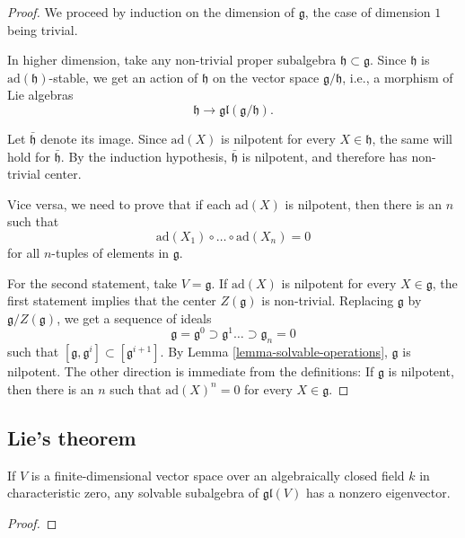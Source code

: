 \begin{proof}
 
We proceed by induction on the dimension of $\mathfrak g$, the case of dimension $1$ being trivial.
 
In higher dimension, take any non-trivial proper subalgebra $\mathfrak h \subset \mathfrak g$. Since $\mathfrak h$ is $\text{ad}(\mathfrak h)$-stable, we get an action of $\mathfrak h$ on the vector space $\mathfrak g/\mathfrak h$, i.e., a morphism of Lie algebras
 $$ \mathfrak h \to \mathfrak{gl}(\mathfrak g/\mathfrak h).$$
 
Let $\bar{\mathfrak h}$ denote its image. Since $\text{ad}(X)$ is nilpotent for every $X\in \mathfrak h$, the same will hold for $\bar{\mathfrak h}$. By the induction hypothesis, $\bar{\mathfrak h}$ is nilpotent, and therefore has non-trivial center.
 
Vice versa, we need to prove that if each $\text{ad}(X)$ is nilpotent, then there is an $n$ such that 
$$ \text{ad}(X_1) \circ \dots \circ \text{ad}(X_n) = 0$$
for all $n$-tuples of elements in $\mathfrak g$. 
 


For the second statement, take $V=\mathfrak g$. If $\text{ad}(X)$ is nilpotent for every $X \in \mathfrak g$, the first statement implies that the center $Z(\mathfrak g)$ is non-trivial. Replacing $\mathfrak g$ by $\mathfrak g/Z(\mathfrak g)$, we get a sequence of ideals 
$$ \mathfrak g = \mathfrak g^0 \supset \mathfrak g^1 \dots \supset \mathfrak g_n=0$$
such that $[\mathfrak g, \mathfrak g^i]\subset [\mathfrak g^{i+1}]$. By Lemma \ref{lemma-solvable-operations}, $\mathfrak g$ is nilpotent. The other direction is immediate from the definitions: If $\mathfrak g$ is nilpotent, then there is an $n$ such that $\text{ad}(X)^n = 0$ for every $X\in \mathfrak g$.
 
\end{proof}


\subsection{Lie's theorem}

\begin{theorem}
 If $V$ is a finite-dimensional vector space over an algebraically closed field $k$ in characteristic zero, any solvable subalgebra of $\mathfrak{gl}(V)$ has a nonzero eigenvector.
\end{theorem}

\begin{proof}
 
\end{proof}




